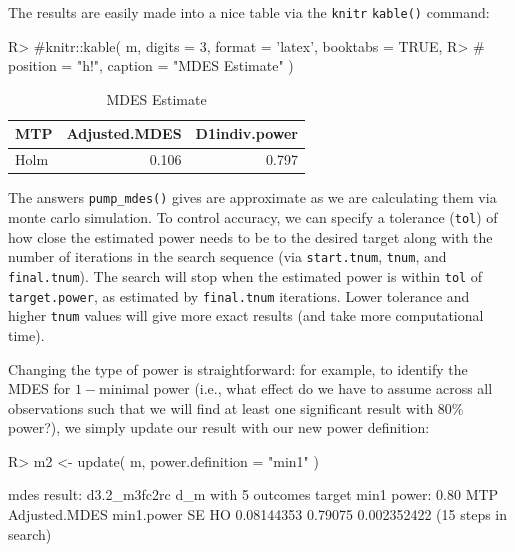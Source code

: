 \documentclass[
]{jss}
\begin{document}
The results are easily made into a nice table via the \texttt{knitr}
\texttt{kable()} command:

\begin{CodeChunk}
\begin{CodeInput}
R> #knitr::kable( m, digits = 3, format = 'latex', booktabs = TRUE,
R> #              position = "h!", caption = "MDES Estimate" )
\end{CodeInput}
\end{CodeChunk}

\begin{table}[h!]
\centering
\caption{MDES Estimate}
\centering
\begin{tabular}[t]{lrr}
\toprule
MTP & Adjusted.MDES & D1indiv.power\\
\midrule
Holm & 0.106 & 0.797\\
\bottomrule
\end{tabular}
\end{table}

The answers \texttt{pump\_mdes()} gives are approximate as we are
calculating them via monte carlo simulation. To control accuracy, we can
specify a tolerance (\texttt{tol}) of how close the estimated power
needs to be to the desired target along with the number of iterations in
the search sequence (via \texttt{start.tnum}, \texttt{tnum}, and
\texttt{final.tnum}). The search will stop when the estimated power is
within \texttt{tol} of \texttt{target.power}, as estimated by
\texttt{final.tnum} iterations. Lower tolerance and higher \texttt{tnum}
values will give more exact results (and take more computational time).

Changing the type of power is straightforward: for example, to identify
the MDES for \(1-\)minimal power (i.e., what effect do we have to assume
across all observations such that we will find at least one significant
result with 80\% power?), we simply update our result with our new power
definition:

\begin{CodeChunk}
\begin{CodeInput}
R> m2 <- update( m, power.definition = "min1" )
\end{CodeInput}
\end{CodeChunk}

\begin{CodeChunk}
\begin{CodeOutput}
mdes result: d3.2_m3fc2rc d_m with 5 outcomes
  target min1 power: 0.80
 MTP Adjusted.MDES min1.power          SE
  HO    0.08144353    0.79075 0.002352422
    (15 steps in search)
\end{CodeOutput}
\end{CodeChunk}
\end{document}
